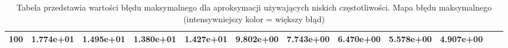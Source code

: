 \begin{table}[H]
\begin{tabular}{|l|ccccccccccc||}
100 & \cellcolor{Red!63}1.774e+01 & \cellcolor{Red!51}1.495e+01 & \cellcolor{Red!45}1.380e+01 & \cellcolor{Red!48}1.427e+01 & \cellcolor{Red!28}9.802e+00 & \cellcolor{Red!18}7.743e+00 & \cellcolor{Red!13}6.470e+00 & \cellcolor{Red!9}5.578e+00 & \cellcolor{Red!6}4.907e+00 \\
\hline
\end{tabular}
\caption{Tabela przedstawia wartości błędu maksymalnego dla aproksymacji używających niskich częstotliwości. Mapa błędu maksymalnego (intensywniejszy kolor = większy błąd)}
\label{tab:small_values_max}
\end{table}

